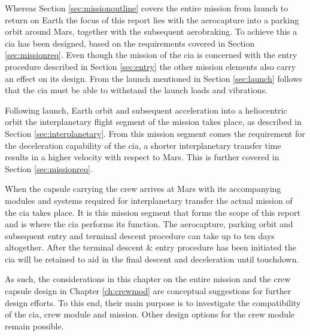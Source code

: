 Whereas Section \ref{sec:missionoutline} covers the entire mission from launch to return on Earth the focus of this report lies with the aerocapture into a parking orbit around Mars, together with the subsequent aerobraking. To achieve this a \gls{cia} has been designed, based on the requirements covered in Section \ref{sec:missionreq}. Even though the mission of the \gls{cia} is concerned with the entry procedure described in Section \ref{sec:entry} the other mission elements also carry an effect on its design. From the launch mentioned in Section \ref{sec:launch} follows that the \gls{cia} must be able to withstand the launch loads and vibrations. 

Following launch, Earth orbit and subsequent acceleration into a heliocentric orbit the interplanetary flight segment of the mission takes place, as described in Section \ref{sec:interplanetary}. From this mission segment comes the requirement for the deceleration capability of the \gls{cia}, a shorter interplanetary transfer time results in a higher velocity with respect to Mars. This is further covered in Section \ref{sec:missionreq}. 

When the capsule carrying the crew arrives at Mars with its accompanying modules and systems required for interplanetary transfer the actual mission of the \gls{cia} takes place. It is this mission segment that forms the scope of this report and is where the \gls{cia} performs its function. The aerocapture, parking orbit and subsequent entry and terminal descent procedure can take up to ten days altogether. After the terminal descent \& entry procedure has been initiated the \gls{cia} will be retained to aid in the final descent and deceleration until touchdown.

As such, the considerations in this chapter on the entire mission and the crew capsule design in Chapter \ref{ch:crewmod} are conceptual suggestions for further design efforts. To this end, their main purpose is to investigate the compatibility of the \gls{cia}, crew module and mission. Other design options for the crew module remain possible.